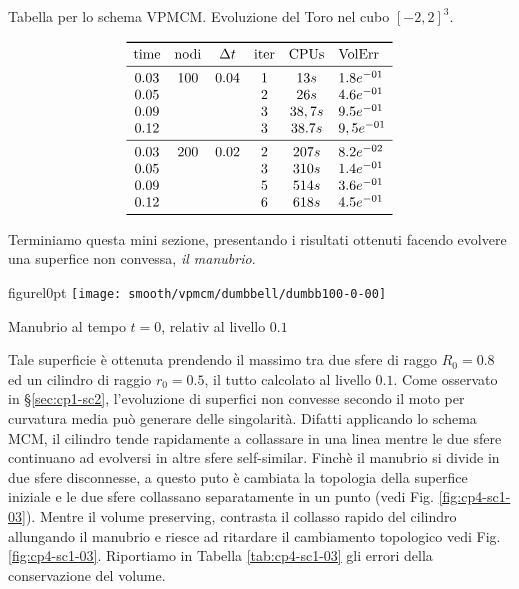 \begin{table}[htb!]
\caption{Tabella per lo schema VPMCM. Evoluzione del Toro nel cubo $[-2,2]^3$.}
\label{tab:cp4-sc1-02}
\[
\begin{array}{*{5}{c}l}
    \toprule
    \text{time} &\text{nodi} &\Delta t &\text{iter} &\text{CPUs}&\text{VolErr} \\
    \midrule
     0.03       & 100        & 0.04    & 1          & 13s      &1.8e^{-01}\\
     0.05       &            &         & 2          & 26s      &4.6e^{-01}\\ 
     0.09       &            &         & 3          & 38,7s    &9.5e^{-01}\\ 
     0.12       &            &         & 3          & 38.7s    &9,5e^{-01}\\
     \midrule
     0.03       & 200        & 0.02    & 2          & 207s     &8.2e^{-02}\\ 
     0.05       &            &         & 3          & 310s     &1.4e^{-01}\\
     0.09       &            &         & 5          & 514s     &3.6e^{-01}\\ 
     0.12       &            &         & 6          & 618s     &4.5e^{-01}\\
    \bottomrule
\end{array}
\]
\end{table}

\newpage

Terminiamo questa mini sezione, presentando i risultati ottenuti
facendo evolvere una superfice non convessa, \emph{il manubrio}.

\begin{wrapfloat}{figure}{l}{0pt}
\texttt{[image: smooth/vpmcm/dumbbell/dumbb100-0-00]}
\caption{Manubrio al tempo $t=0$, relativ al livello $0.1$}
\end{wrapfloat}

Tale superficie è ottenuta prendendo il massimo tra due sfere di raggo
$R_0=0.8$ ed un cilindro di raggio $r_0=0.5$, il tutto calcolato al
livello $0.1$. Come osservato in §\ref{sec:cp1-sc2}, l'evoluzione di
superfici non convesse secondo il moto per curvatura media può
generare delle singolarità. Difatti applicando lo schema MCM, il
cilindro tende rapidamente a collassare in una linea mentre le due
sfere continuano ad evolversi in altre sfere self-similar. Finchè il
manubrio si divide in due sfere disconnesse, a questo puto è cambiata
la topologia della superfice iniziale e le due sfere collassano
separatamente in un punto (vedi Fig. \ref{fig:cp4-sc1-03}).
Mentre il volume preserving, contrasta il collasso rapido  del
cilindro allungando il manubrio e riesce ad ritardare il cambiamento
topologico vedi Fig. \ref{fig:cp4-sc1-03}. Riportiamo in Tabella \ref{tab:cp4-sc1-03}  gli errori
della conservazione del volume.

